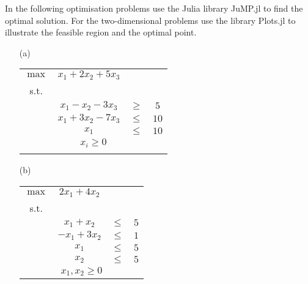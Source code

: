 In the following optimisation problems use the Julia library JuMP.jl to find the optimal solution. For the two-dimensional problems use the library Plots.jl to illustrate the feasible region and the optimal point.

\begin{center}
	\begin{enumerate}
		\item[(a)]
		\begin{tabular}{*4c}
			$\max$ & $x_1 + 2x_2 + 5x_3$ & \\
			s.t. \\
			& $x_1 - x_2 - 3x_3$ & $\geq$ & $5$\\
			& $x_1 + 3x_2 - 7x_3$ & $\leq$ & $10$\\
			& $x_1$ & $\leq$ & $10$\\
			\multicolumn{4}{c}{$x_i \geq 0$}\\
		\\
		\end{tabular}
		\item[(b)]
		\begin{tabular}{*4c}
			$\max$ & $2x_1 + 4x_2$ & \\
			s.t. \\
			& $x_1 + x_2$ & $\leq$ & $5$\\
			& $-x_1 + 3x_2$ & $\leq$ & $1$\\
			& $x_1$ & $\leq$ & $5$\\
			& $x_2$ & $\leq$ & $5$\\
			\multicolumn{4}{c}{$x_1, x_2 \geq 0$}\\
		\end{tabular}
	\end{enumerate}
\end{center}

